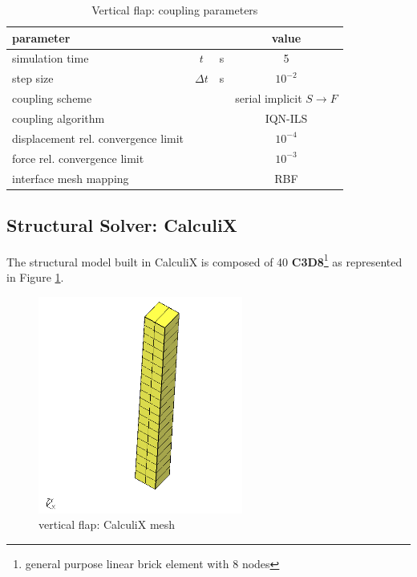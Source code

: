 \begin{table}[!htb]
	\begin{center}
		\begin{tabular}{ l c  l| c } 
			parameter & & & value   \\ 
			\hline
			simulation time  & $t$& \si{s} & 5      \\
			step size & $\Delta t$ & \si{s} & $10^{-2}$   \\
			\hline
			coupling scheme & & & serial implicit  $S\rightarrow F$  \\
			coupling algorithm & & &  IQN-ILS  \\
			displacement rel. convergence limit & & & $10^{-4}$ \\
			force rel. convergence limit &&  & $10^{-3}$  \\
      		interface mesh mapping & & & RBF  \\
			
		\end{tabular}
	\end{center}
	\caption{Vertical flap: coupling parameters}
	\label{table:ex1-coupling}
\end{table}





\subsection{Structural Solver: CalculiX}

The structural model built in CalculiX is composed of 40 \textbf{C3D8}\footnote{general purpose linear brick element with 8 nodes} as represented in Figure \ref{fig:cx-mesh}. 

\begin{figure}[htbp!]
	\centering
	\includegraphics[width=0.6\textwidth]{images/cx1}
	\caption{vertical flap: CalculiX mesh}
	\label{fig:cx-mesh}
\end{figure}

